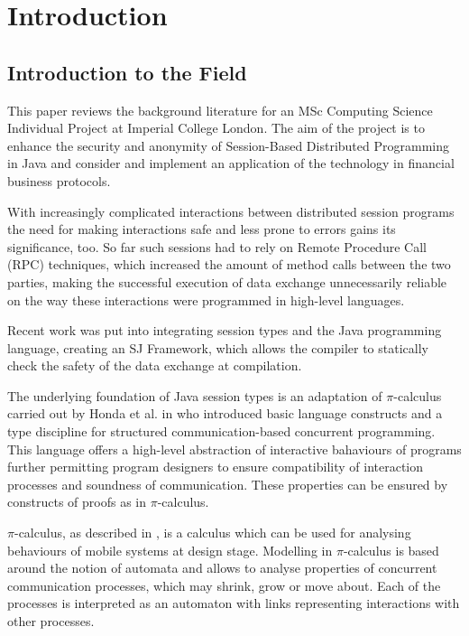 \chapter{Introduction}
\label{sec:intro}

\section{Introduction to the Field}
This paper reviews the background literature for an MSc Computing Science Individual Project at Imperial College London. The aim of the project is to enhance the security and anonymity of Session-Based Distributed Programming in Java and consider and implement an application of the technology in financial business protocols.

With increasingly complicated interactions between distributed session programs the need for making interactions safe and less prone to errors gains its significance, too. So far such sessions had to rely on Remote Procedure Call (RPC) techniques, which increased the amount of method calls between the two parties, making the successful execution of data exchange unnecessarily reliable on the way these interactions were programmed in high-level languages.

Recent work was put into integrating session types and the Java programming language, creating an SJ Framework, which allows the compiler to statically check the safety of the data exchange at compilation\cite{sessionbased_programming}.

The underlying foundation of Java session types is an adaptation of $\pi$-calculus carried out by Honda et al. in \cite{language_primitives} who introduced basic language constructs and a type discipline for structured communication-based concurrent programming. This language offers a high-level abstraction of interactive bahaviours of programs further permitting program designers to ensure compatibility of interaction processes and soundness of communication. These properties can be ensured by constructs of proofs as in $\pi$-calculus.

$\pi$-calculus, as described in \cite{pi-calculus}, is a calculus which can be used for analysing behaviours of mobile systems at design stage. Modelling in $\pi$-calculus is based around the notion of automata and allows to analyse properties of concurrent communication processes, which may shrink, grow or move about. Each of the processes is interpreted as an automaton with links representing interactions with other processes.

